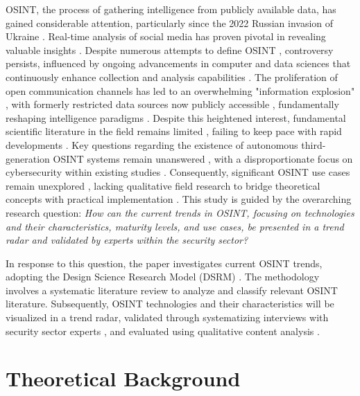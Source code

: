 \documentclass[10pt]{article}
\begin{document}
OSINT, the process of gathering intelligence from publicly available data, has gained considerable attention, particularly since
the 2022 Russian invasion of Ukraine \cite{DosPassos.2017}. Real-time analysis of social media has proven pivotal in revealing
valuable insights \cite{Hatfield.2023, SmithBoyle.24.07.2023}. Despite numerous attempts to define OSINT
\cite{Hwang.2022, PastorGalindo.2020, Yogish.2021}, controversy persists, influenced by ongoing advancements in computer and
data sciences that continuously enhance collection and analysis capabilities \cite{Ghioni.2023, Williams.2018}. The
proliferation of open communication channels has led to an overwhelming "information explosion"
\cite{DosPassos.2017, Hwang.2022, Yogish.2021}, with formerly restricted data sources now publicly accessible
\cite{Hwang.2022, Williams.2018}, fundamentally reshaping intelligence paradigms \cite{Dokman.2020}.
Despite this heightened interest, fundamental scientific literature in the field remains limited \cite{HerreraCubides.2020},
failing to keep pace with rapid developments \cite{Ghioni.2023, Williams.2018}. Key questions regarding the existence of
autonomous third-generation OSINT systems \cite{PastorGalindo.2019, PastorGalindo.2020} remain unanswered
\cite{Ghioni.2023, PastorGalindo.2020, Yogish.2021}, with a disproportionate focus on cybersecurity within existing
studies \cite{Hwang.2022, PastorGalindo.2019, Yogish.2021}. Consequently, significant OSINT use cases remain unexplored
\cite{AlKilani.2021, Dokman.2020, Ghioni.2023}, lacking qualitative field research to bridge theoretical concepts with
practical implementation \cite{HerreraCubides.2020, PastorGalindo.2019}. This study is guided by the overarching research
question: \textit{How can the current trends in OSINT, focusing on technologies and their characteristics, maturity levels,
    and use cases, be presented in a trend radar and validated by experts within the security sector?}

In response to this question,
the paper investigates current OSINT trends, adopting the Design Science Research Model (DSRM) \cite{Peffers.2007}.
The methodology involves a systematic literature review \cite{Webster.2002} to analyze and classify relevant OSINT literature.
Subsequently, OSINT technologies and their characteristics will be visualized in a trend radar, validated through systematizing
interviews with security sector experts \cite{Bogner.2014}, and evaluated using qualitative content analysis \cite{Billings.1997}.


\section{Theoretical Background} \label{sec:theoreticalbackground}
\end{document}
